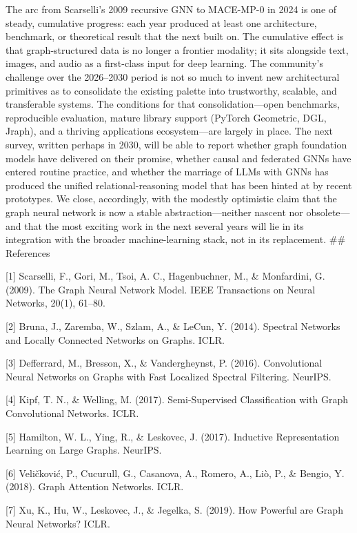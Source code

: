 The arc from Scarselli's 2009 recursive GNN to MACE-MP-0 in 2024 is one of steady, cumulative progress: each year produced at least one architecture, benchmark, or theoretical result that the next built on. The cumulative effect is that graph-structured data is no longer a frontier modality; it sits alongside text, images, and audio as a first-class input for deep learning. The community's challenge over the 2026--2030 period is not so much to invent new architectural primitives as to consolidate the existing palette into trustworthy, scalable, and transferable systems. The conditions for that consolidation---open benchmarks, reproducible evaluation, mature library support (PyTorch Geometric, DGL, Jraph), and a thriving applications ecosystem---are largely in place. The next survey, written perhaps in 2030, will be able to report whether graph foundation models have delivered on their promise, whether causal and federated GNNs have entered routine practice, and whether the marriage of LLMs with GNNs has produced the unified relational-reasoning model that has been hinted at by recent prototypes. We close, accordingly, with the modestly optimistic claim that the graph neural network is now a stable abstraction---neither nascent nor obsolete---and that the most exciting work in the next several years will lie in its integration with the broader machine-learning stack, not in its replacement.
\#\# References

{[}1{]} Scarselli, F., Gori, M., Tsoi, A. C., Hagenbuchner, M., \& Monfardini, G. (2009). The Graph Neural Network Model. IEEE Transactions on Neural Networks, 20(1), 61--80.

{[}2{]} Bruna, J., Zaremba, W., Szlam, A., \& LeCun, Y. (2014). Spectral Networks and Locally Connected Networks on Graphs. ICLR.

{[}3{]} Defferrard, M., Bresson, X., \& Vandergheynst, P. (2016). Convolutional Neural Networks on Graphs with Fast Localized Spectral Filtering. NeurIPS.

{[}4{]} Kipf, T. N., \& Welling, M. (2017). Semi-Supervised Classification with Graph Convolutional Networks. ICLR.

{[}5{]} Hamilton, W. L., Ying, R., \& Leskovec, J. (2017). Inductive Representation Learning on Large Graphs. NeurIPS.

{[}6{]} Veličković, P., Cucurull, G., Casanova, A., Romero, A., Liò, P., \& Bengio, Y. (2018). Graph Attention Networks. ICLR.

{[}7{]} Xu, K., Hu, W., Leskovec, J., \& Jegelka, S. (2019). How Powerful are Graph Neural Networks? ICLR.

